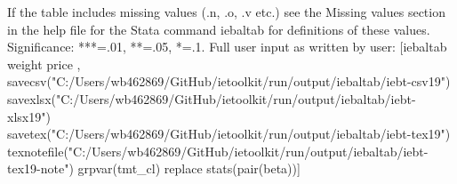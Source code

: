 If the table includes missing values (.n, .o, .v etc.) see the Missing values section in the help file for the Stata command iebaltab for definitions of these values. Significance: ***=.01, **=.05, *=.1. Full user input as written by user: [iebaltab weight price , savecsv("C:/Users/wb462869/GitHub/ietoolkit/run/output/iebaltab/iebt-csv19") savexlsx("C:/Users/wb462869/GitHub/ietoolkit/run/output/iebaltab/iebt-xlsx19") savetex("C:/Users/wb462869/GitHub/ietoolkit/run/output/iebaltab/iebt-tex19") texnotefile("C:/Users/wb462869/GitHub/ietoolkit/run/output/iebaltab/iebt-tex19-note") grpvar(tmt\_cl) replace stats(pair(beta))]
